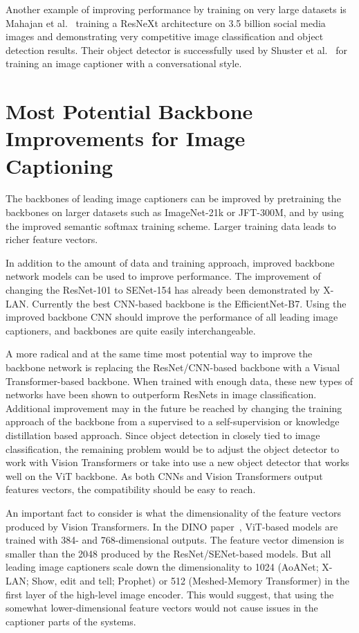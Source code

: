 \documentclass[english,twoside,openright]{HYgraduMLDS}
\begin{document}
Another example of improving performance by training on very large datasets is Mahajan et al.~\cite{LargeScalePretraining} training a ResNeXt architecture on 3.5 billion social media images and demonstrating very competitive image classification and object detection results. Their object detector is successfully used by Shuster et al.~\cite{PersonalityCaptions} for training an image captioner with a conversational style.

\section{Most Potential Backbone Improvements for Image Captioning}
\label{section:BackboneImprovements}
The backbones of leading image captioners can be improved by pretraining the backbones on larger datasets such as ImageNet-21k or JFT-300M, and by using the improved semantic softmax training scheme. Larger training data leads to richer feature vectors. 

In addition to the amount of data and training approach, improved backbone network models can be used to improve performance. The improvement of changing the ResNet-101 to SENet-154 has already been demonstrated by X-LAN. Currently the best CNN-based backbone is the EfficientNet-B7. Using the improved backbone CNN should improve the performance of all leading image captioners, and backbones are quite easily interchangeable.

A more radical and at the same time most potential way to improve the backbone network is replacing the ResNet/CNN-based backbone with a Visual Transformer-based backbone. When trained with enough data, these new types of networks have been shown to outperform ResNets in image classification. Additional improvement may in the future be reached by changing the training approach of the backbone from a supervised to a self-supervision or knowledge distillation based approach. Since object detection in closely tied to image classification, the remaining problem would be to adjust the object detector to work with Vision Transformers or take into use a new object detector that works well on the ViT backbone. As both CNNs and Vision Transformers output features vectors, the compatibility should be easy to reach.

An important fact to consider is what the dimensionality of the feature vectors produced by Vision Transformers. In the DINO paper~\cite{DINO}, ViT-based models are trained with 384- and 768-dimensional outputs. The feature vector dimension is smaller than the 2048 produced by the ResNet/SENet-based models. But all leading image captioners scale down the dimensionality to 1024 (AoANet; X-LAN; Show, edit and tell; Prophet) or 512 (Meshed-Memory Transformer) in the first layer of the high-level image encoder. This would suggest, that using the somewhat lower-dimensional feature vectors would not cause issues in the captioner parts of the systems.
\end{document}
